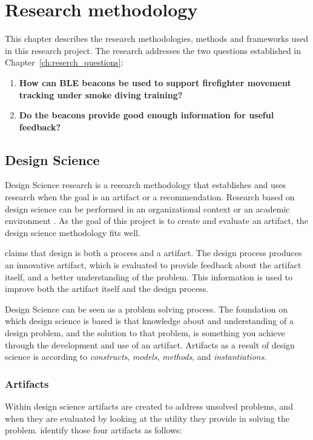\documentclass[../Main/thesis.tex]{subfiles}
\begin{document}
\chapter{Research methodology}
\label{ch:research_methodology}
This chapter describes the research methodologies, methods and frameworks used in this research project.
The research addresses the two questions established in Chapter~\ref{ch:reserch_questions}:

\begin{enumerate}
	\item \textbf{How can BLE beacons be used to support firefighter movement tracking under smoke diving training?}
	\item \textbf{Do the beacons provide good enough information for useful feedback?}
\end{enumerate}

\section{Design Science}
Design Science research is a research methodology that establishes and uses research when the goal is an artifact or a recommendation.
Research based on design science can be performed in an organizational context or an academic environment \citep{lacerda2015design}.
As the goal of this project is to create and evaluate an artifact, the design science methodology fits well.

\citet{hevner2004design} claims that design is both a process and a artifact.
The design process produces an innovative artifact, which is evaluated to provide feedback about the artifact itself, and a better understanding of the problem. 
This information is used to improve both the artifact itself and the design process.

Design Science can be seen as a problem solving process.
The foundation on which design science is based is that knowledge about and understanding of a design problem, and the solution to that problem, is something you achieve through the development and use of an artifact.
Artifacts as a result of design science is according to \citet{March1995} \textit{constructs}, \textit{models}, \textit{methods}, and \textit{instantiations}.


\subsection{Artifacts}
Within design science artifacts are created to address unsolved problems, and when they are evaluated by looking at the utility they provide in solving the problem.
\citet[p.78-79]{hevner2004design} identify those four artifacts as follows:
\end{document}
